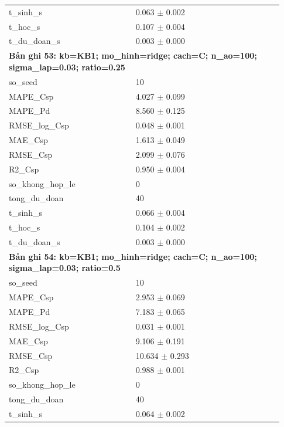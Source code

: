 \begin{longtable}{p{0.43\linewidth}p{0.50\linewidth}}
t\_\allowbreak sinh\_\allowbreak s & 0.063 $\pm$ 0.002 \\
t\_\allowbreak hoc\_\allowbreak s & 0.107 $\pm$ 0.004 \\
t\_\allowbreak du\_\allowbreak doan\_\allowbreak s & 0.003 $\pm$ 0.000 \\
\midrule
\multicolumn{2}{p{0.95\linewidth}}{\textbf{Bản ghi 53: kb=KB1; mo\_hinh=ridge; cach=C; n\_ao=100; sigma\_lap=0.03; ratio=0.25}} \\
so\_\allowbreak seed & 10 \\
MAPE\_\allowbreak Csp & 4.027 $\pm$ 0.099 \\
MAPE\_\allowbreak Pd & 8.560 $\pm$ 0.125 \\
RMSE\_\allowbreak log\_\allowbreak Csp & 0.048 $\pm$ 0.001 \\
MAE\_\allowbreak Csp & 1.613 $\pm$ 0.049 \\
RMSE\_\allowbreak Csp & 2.099 $\pm$ 0.076 \\
R2\_\allowbreak Csp & 0.950 $\pm$ 0.004 \\
so\_\allowbreak khong\_\allowbreak hop\_\allowbreak le & 0 \\
tong\_\allowbreak du\_\allowbreak doan & 40 \\
t\_\allowbreak sinh\_\allowbreak s & 0.066 $\pm$ 0.004 \\
t\_\allowbreak hoc\_\allowbreak s & 0.104 $\pm$ 0.002 \\
t\_\allowbreak du\_\allowbreak doan\_\allowbreak s & 0.003 $\pm$ 0.000 \\
\midrule
\multicolumn{2}{p{0.95\linewidth}}{\textbf{Bản ghi 54: kb=KB1; mo\_hinh=ridge; cach=C; n\_ao=100; sigma\_lap=0.03; ratio=0.5}} \\
so\_\allowbreak seed & 10 \\
MAPE\_\allowbreak Csp & 2.953 $\pm$ 0.069 \\
MAPE\_\allowbreak Pd & 7.183 $\pm$ 0.065 \\
RMSE\_\allowbreak log\_\allowbreak Csp & 0.031 $\pm$ 0.001 \\
MAE\_\allowbreak Csp & 9.106 $\pm$ 0.191 \\
RMSE\_\allowbreak Csp & 10.634 $\pm$ 0.293 \\
R2\_\allowbreak Csp & 0.988 $\pm$ 0.001 \\
so\_\allowbreak khong\_\allowbreak hop\_\allowbreak le & 0 \\
tong\_\allowbreak du\_\allowbreak doan & 40 \\
t\_\allowbreak sinh\_\allowbreak s & 0.064 $\pm$ 0.002 \\

\end{longtable}
